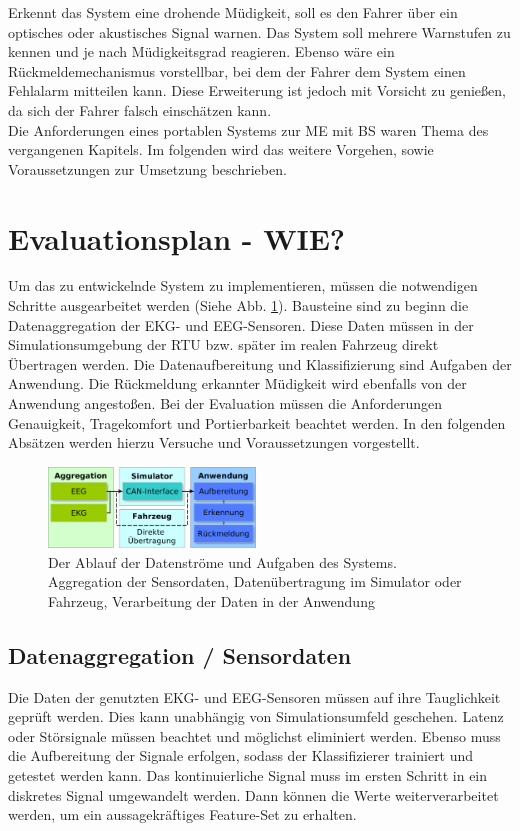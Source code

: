 {Erkennt das System eine drohende Müdigkeit, soll es den Fahrer über ein optisches oder akustisches Signal warnen. Das System soll mehrere Warnstufen zu kennen und je nach Müdigkeitsgrad reagieren. Ebenso wäre ein Rückmeldemechanismus vorstellbar, bei dem der Fahrer dem System einen Fehlalarm mitteilen kann. Diese Erweiterung ist jedoch mit Vorsicht zu genießen, da sich der Fahrer falsch einschätzen kann.\\

Die Anforderungen eines portablen Systems zur \acl{ME} mit \acl{BS} waren Thema des vergangenen Kapitels. Im folgenden wird das weitere Vorgehen, sowie Voraussetzungen zur Umsetzung beschrieben.

\section{Evaluationsplan - WIE?}
\label{chap:eval}
Um das zu entwickelnde System zu implementieren, müssen die notwendigen Schritte ausgearbeitet werden (Siehe Abb. \ref{fig:block}). Bausteine sind zu beginn die Datenaggregation der EKG- und EEG-Sensoren. Diese Daten müssen in der  Simulationsumgebung  der \acl{RTU} bzw. später im realen Fahrzeug direkt Übertragen werden. Die Datenaufbereitung und Klassifizierung sind Aufgaben der Anwendung. Die Rückmeldung erkannter Müdigkeit wird ebenfalls von der Anwendung angestoßen. 
Bei der Evaluation müssen die Anforderungen Genauigkeit, Tragekomfort und Portierbarkeit beachtet werden. In den folgenden Absätzen werden hierzu Versuche und Voraussetzungen vorgestellt.

\begin{figure}[h] 
  \begin{center}
    \includegraphics[width=5.5cm]{img/block}
    \caption{Der Ablauf der Datenströme und Aufgaben des Systems. Aggregation der Sensordaten, Datenübertragung im Simulator oder Fahrzeug, Verarbeitung der Daten in der Anwendung}
    \label{fig:block}
  \end{center}
\end{figure}

\subsection{Datenaggregation / Sensordaten}
Die Daten der genutzten EKG- und EEG-Sensoren müssen auf ihre Tauglichkeit geprüft werden. Dies kann unabhängig von Simulationsumfeld geschehen. Latenz oder Störsignale müssen beachtet und möglichst eliminiert werden. Ebenso muss die Aufbereitung der Signale erfolgen, sodass der Klassifizierer trainiert und getestet werden kann. Das kontinuierliche Signal muss im ersten Schritt in ein diskretes Signal umgewandelt werden. Dann können die Werte weiterverarbeitet werden, um ein aussagekräftiges Feature-Set zu erhalten.\\

}
